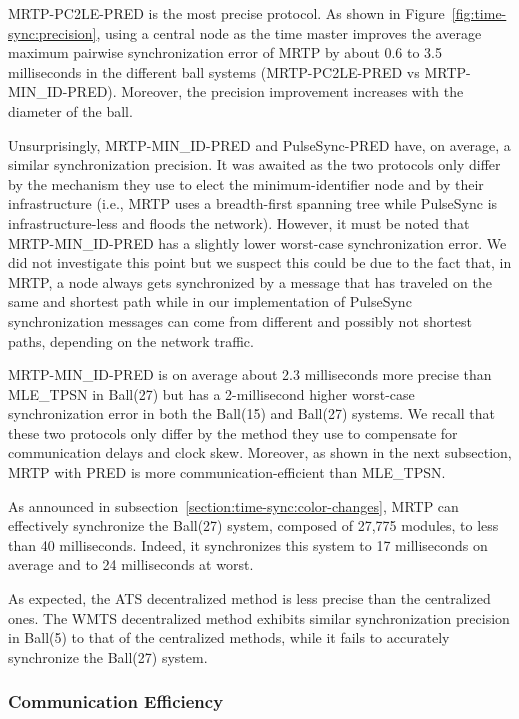 MRTP-PC2LE-PRED is the most precise protocol. As shown in Figure~\ref{fig:time-sync:precision}, using a central node as the time master improves the average maximum pairwise synchronization error of MRTP by about 0.6 to 3.5 milliseconds in the different ball systems (MRTP-PC2LE-PRED vs MRTP-MIN\_ID-PRED). Moreover, the precision improvement increases with the diameter of the ball.

Unsurprisingly, MRTP-MIN\_ID-PRED and PulseSync-PRED have, on average, a similar synchronization precision. It was awaited as the two protocols only differ by the mechanism they use to elect the minimum-identifier node and by their infrastructure (i.e., MRTP uses a breadth-first spanning tree while PulseSync is infrastructure-less and floods the network). However, it must be noted that MRTP-MIN\_ID-PRED has a slightly lower worst-case synchronization error. We did not investigate this point but we suspect this could be due to the fact that, in MRTP, a node always gets synchronized by a message that has traveled on the same and shortest path while in our implementation of PulseSync synchronization messages can come from different and possibly not shortest paths, depending on the network traffic.

MRTP-MIN\_ID-PRED is on average about 2.3 milliseconds more precise than MLE\_TPSN in Ball(27) but has a 2-millisecond higher worst-case synchronization error in both the Ball(15) and Ball(27) systems. We recall that these two protocols only differ by the method they use to compensate for communication delays and clock skew. Moreover, as shown in the next subsection, MRTP with PRED is more communication-efficient than MLE\_TPSN.

As announced in subsection~\ref{section:time-sync:color-changes}, MRTP can effectively synchronize the Ball(27) system, composed of 27,775 modules, to less than 40 milliseconds. Indeed, it synchronizes this system to 17 milliseconds on average and to 24 milliseconds at worst.

As expected, the ATS decentralized method is less precise than the centralized ones. The WMTS decentralized method exhibits similar synchronization precision in Ball(5) to that of the centralized methods, while it fails to accurately synchronize the Ball(27) system.

\subsubsection{Communication Efficiency}
\label{section:time-sync:communication-efficiency}

